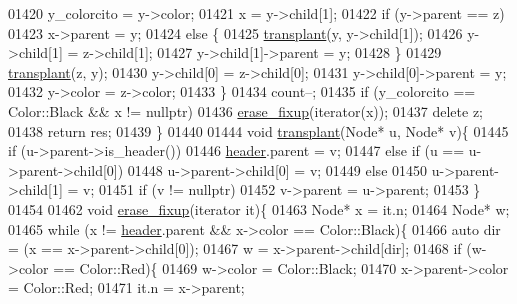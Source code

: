 \begin{DoxyCode}
01420             y\_colorcito = y->color;
01421             x = y->child[1];
01422             \textcolor{keywordflow}{if} (y->parent == z)
01423                 x->parent = y;
01424             \textcolor{keywordflow}{else} \{
01425                 \hyperlink{classaed2_1_1map_a98b9f200c64ce02dfb67902ee00e375a_a98b9f200c64ce02dfb67902ee00e375a}{transplant}(y, y->child[1]);
01426                 y->child[1] = z->child[1];
01427                 y->child[1]->parent = y;
01428             \}
01429             \hyperlink{classaed2_1_1map_a98b9f200c64ce02dfb67902ee00e375a_a98b9f200c64ce02dfb67902ee00e375a}{transplant}(z, y);
01430             y->child[0] = z->child[0];
01431             y->child[0]->parent = y;
01432             y->color = z->color;
01433         \}
01434         count--;
01435         \textcolor{keywordflow}{if} (y\_colorcito == Color::Black && x != \textcolor{keyword}{nullptr})
01436             \hyperlink{classaed2_1_1map_a7870c8f26e82b00d0aeb2e9f331dfec6_a7870c8f26e82b00d0aeb2e9f331dfec6}{erase_fixup}(iterator(x));
01437         \textcolor{keyword}{delete} z;
01438         \textcolor{keywordflow}{return} res;
01439     \}
01440 
01444     \textcolor{keywordtype}{void} \hyperlink{classaed2_1_1map_a98b9f200c64ce02dfb67902ee00e375a_a98b9f200c64ce02dfb67902ee00e375a}{transplant}(Node* u, Node* v)\{
01445         \textcolor{keywordflow}{if} (u->parent->is\_header())
01446             \hyperlink{classaed2_1_1map_a92d93f905c8ad73fba18fdc7e8915cce_a92d93f905c8ad73fba18fdc7e8915cce}{header}.parent = v;
01447         \textcolor{keywordflow}{else} if (u == u->parent->child[0])
01448             u->parent->child[0] = v;
01449         \textcolor{keywordflow}{else}
01450             u->parent->child[1] = v;
01451         \textcolor{keywordflow}{if} (v != \textcolor{keyword}{nullptr})
01452             v->parent = u->parent;
01453     \}
01454 
01462     \textcolor{keywordtype}{void} \hyperlink{classaed2_1_1map_a7870c8f26e82b00d0aeb2e9f331dfec6_a7870c8f26e82b00d0aeb2e9f331dfec6}{erase_fixup}(iterator it)\{
01463         Node* x = it.n;
01464         Node* w;
01465         \textcolor{keywordflow}{while} (x != \hyperlink{classaed2_1_1map_a92d93f905c8ad73fba18fdc7e8915cce_a92d93f905c8ad73fba18fdc7e8915cce}{header}.parent && x->color == Color::Black)\{
01466             \textcolor{keyword}{auto} dir = (x == x->parent->child[0]);
01467             w = x->parent->child[dir];
01468             \textcolor{keywordflow}{if} (w->color == Color::Red)\{
01469                 w->color = Color::Black;
01470                 x->parent->color = Color::Red;
01471                 it.n = x->parent;

\end{DoxyCode}
